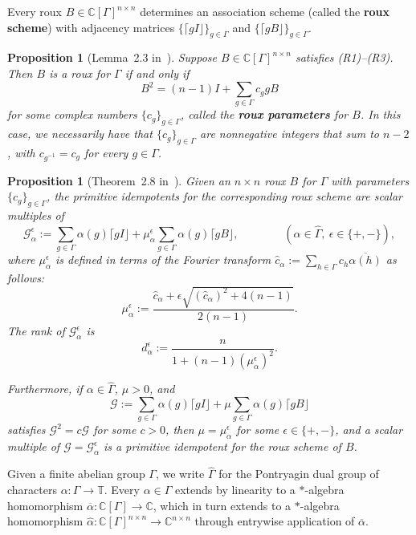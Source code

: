 \documentclass[11pt]{article}
\newtheorem{proposition}[theo]{Proposition}
\theoremstyle{definition}
\numberwithin{equation}{section}
\begin{document}
Every roux $B \in \mathbb{C}[\Gamma]^{n\times n}$ determines an association scheme (called the \textbf{roux scheme}) with adjacency matrices $\{ \lceil g I \rfloor \}_{g \in \Gamma}$ and $\{ \lceil gB \rfloor \}_{g \in \Gamma}$.

\begin{proposition}[Lemma~2.3 in~\cite{IversonM:18}]
\label{prop.B squared}
Suppose $B\in\mathbb{C}[\Gamma]^{n\times n}$ satisfies (R1)--(R3).
Then $B$ is a roux for $\Gamma$ if and only if
\[
B^2=(n-1)I+\sum_{g\in\Gamma}c_ggB
\]
for some complex numbers $\{c_g\}_{g\in\Gamma}$, called the \textbf{roux parameters} for $B$.
In this case, we necessarily have that $\{c_g\}_{g\in\Gamma}$ are nonnegative integers that sum to $n-2$, with $c_{g^{-1}}=c_g$ for every $g\in\Gamma$.
\end{proposition}


\begin{proposition}[Theorem~2.8 in~\cite{IversonM:18}]
\label{prop.roux primitive idempotents}
Given an $n\times n$ roux $B$ for $\Gamma$ with parameters $\{ c_g \}_{g \in \Gamma}$, the primitive idempotents for the corresponding roux scheme are scalar multiples of
\[
\mathcal{G}_{\alpha}^\epsilon
:=\sum_{g\in\Gamma}\alpha(g)\lceil gI\rfloor+\mu_\alpha^\epsilon\sum_{g\in\Gamma}\alpha(g) \lceil gB \rfloor,
\qquad
\qquad
(\alpha\in\hat\Gamma,~\epsilon\in\{+,-\}),
\]
where $\mu_\alpha^\epsilon$ is defined in terms of the Fourier transform $\hat{c}_\alpha:=\sum_{h\in\Gamma}c_h\overline{\alpha(h)}$ as follows:
\[
\mu_\alpha^\epsilon
:=\frac{\hat{c}_\alpha+\epsilon\sqrt{(\hat{c}_\alpha)^2+4(n-1)}}{2(n-1)}.
\]
The rank of $\mathcal{G}_\alpha^\epsilon$ is
\[
d_\alpha^\epsilon :=\frac{n}{1+(n-1)(\mu_\alpha^\epsilon)^2}.
\]

Furthermore, if $\alpha \in \hat{\Gamma}$, $\mu > 0$, and 
\[ \mathcal{G} := \sum_{g\in\Gamma}\alpha(g)\lceil gI\rfloor+\mu \sum_{g\in\Gamma}\alpha(g) \lceil gB \rfloor \]
satisfies $\mathcal{G}^2 = c \mathcal{G}$ for some $c >0$, then $\mu = \mu_\alpha^\epsilon$ for some $\epsilon \in \{ +, - \}$, and a scalar multiple of $\mathcal{G} = \mathcal{G}_\alpha^\epsilon$ is a primitive idempotent for the roux scheme of $B$.
\end{proposition}

Given a finite abelian group $\Gamma$, we write $\hat{\Gamma}$ for the Pontryagin dual group of characters $\alpha \colon \Gamma \to \mathbb{T}$.
Every $\alpha \in \hat{\Gamma}$ extends by linearity to a $\ast$-algebra homomorphism $\overline{\alpha} \colon \mathbb{C}[\Gamma] \to \mathbb{C}$, which in turn extends to a $\ast$-algebra homomorphism $\hat{\alpha} \colon \mathbb{C}[\Gamma]^{n\times n} \to \mathbb{C}^{n\times n}$ through entrywise application of $\overline{\alpha}$.
\end{document}
